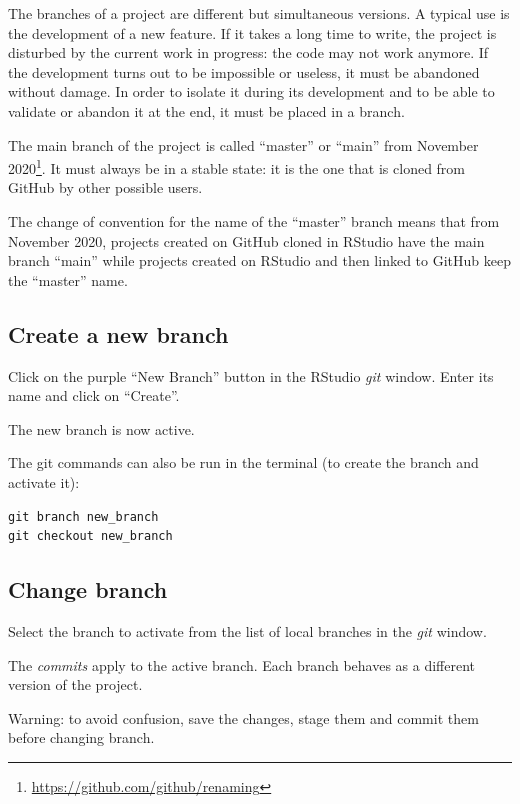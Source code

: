 \documentclass[
  12pt,
  american,
  a4paper,
  extrafontsizes,onecolumn,openright
  ]{memoir}
\begin{document}
The branches of a project are different but simultaneous versions.
A typical use is the development of a new feature.
If it takes a long time to write, the project is disturbed by the current work in progress: the code may not work anymore.
If the development turns out to be impossible or useless, it must be abandoned without damage.
In order to isolate it during its development and to be able to validate or abandon it at the end, it must be placed in a branch.

The main branch of the project is called \enquote{master} or \enquote{main} from November 2020\footnote{\url{https://github.com/github/renaming}}.
It must always be in a stable state: it is the one that is cloned from GitHub by other possible users.

The change of convention for the name of the \enquote{master} branch means that from November 2020, projects created on GitHub cloned in RStudio have the main branch \enquote{main} while projects created on RStudio and then linked to GitHub keep the \enquote{master} name.

\hypertarget{create-a-new-branch}{%
\subsection{Create a new branch}\label{create-a-new-branch}}

Click on the purple \enquote{New Branch} button in the RStudio \emph{git} window.
Enter its name and click on \enquote{Create}.

The new branch is now active.

The git commands can also be run in the terminal (to create the branch and activate it):

\begin{verbatim}
git branch new_branch
git checkout new_branch
\end{verbatim}

\hypertarget{change-branch}{%
\subsection{Change branch}\label{change-branch}}

Select the branch to activate from the list of local branches in the \emph{git} window.

The \emph{commits} apply to the active branch.
Each branch behaves as a different version of the project.

Warning: to avoid confusion, save the changes, stage them and commit them before changing branch.
\end{document}
